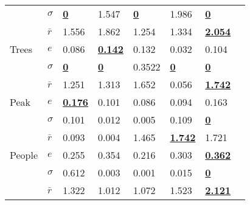 \documentclass[doctor,english,listoffigures,listoftables]{thesis-uestc}
\begin{document}
\begin{table*}[!htb]
\begin{tabular}{|p{56pt}|p{50pt}|p{53pt}|p{53pt}|p{53pt}|p{53pt}|p{53pt}|p{50pt}|}
		& $\sigma$&\textbf{\underline{0}}&1.547&\textbf{\underline{0}}&1.986&\textbf{\textbf{\underline{0}}}

		\\    	

		& $\bar r$&1.556&1.862&1.254&1.334&\textbf{\underline{2.054}}

		\\   
		 \hline

		 \hline

		 
		
		Trees&$ e$&0.086&\textbf{\textbf{\underline{0.142}}}&0.132&0.032&0.104

		\\    

		& $\sigma$&\textbf{\underline{0}}&\textbf{\underline{0}}&0.3522&\textbf{\underline{0}}&\textbf{\underline{0}}

		\\    

		& $\bar r$&1.251&1.313&1.652&0.056&\textbf{\underline{1.742}}

		\\   
		 \hline

		 \hline

		
		Peak&$ e$&\textbf{\underline{0.176}}&0.101&0.086&0.094&0.163

	\\    

& $\sigma$&	0.101&0.012&0.005&0.109&\textbf{\underline{0}}

\\    

& $\bar r$&	0.093&0.004&1.465&\textbf{\textbf{\underline{1.742}}}&1.721

\\    
\hline

 \hline
		People&$ e$&0.255&0.354&0.216&0.303&\textbf{\underline{0.362}}

		\\    

		& $\sigma$&0.612&0.003&0.001&0.015&\textbf{\underline{0}}

		\\    	

		& $\bar r$&1.322&1.012&1.072&1.523&\textbf{\underline{2.121}}
		\\   
		 \hline

		\hline		
	\end{tabular}
	\label{Tab4}
\end{table*}	
 
\end{document}
